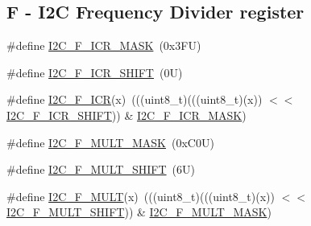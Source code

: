 \subsection*{F -\/ I2C Frequency Divider register}
\begin{DoxyCompactItemize}
\item 
\#define \mbox{\hyperlink{group___i2_c___register___masks_gaeb777a93b5695409902fb2f2b77eb760}{I2\+C\+\_\+\+F\+\_\+\+I\+C\+R\+\_\+\+M\+A\+SK}}~(0x3\+F\+U)
\item 
\#define \mbox{\hyperlink{group___i2_c___register___masks_ga8e2daf0de75e77e33467f6b132be0c30}{I2\+C\+\_\+\+F\+\_\+\+I\+C\+R\+\_\+\+S\+H\+I\+FT}}~(0\+U)
\item 
\#define \mbox{\hyperlink{group___i2_c___register___masks_ga18089fd1cbe1936b133d50d580d39e6d}{I2\+C\+\_\+\+F\+\_\+\+I\+CR}}(x)~(((uint8\+\_\+t)(((uint8\+\_\+t)(x)) $<$$<$ \mbox{\hyperlink{group___i2_c___register___masks_ga8e2daf0de75e77e33467f6b132be0c30}{I2\+C\+\_\+\+F\+\_\+\+I\+C\+R\+\_\+\+S\+H\+I\+FT}})) \& \mbox{\hyperlink{group___i2_c___register___masks_gaeb777a93b5695409902fb2f2b77eb760}{I2\+C\+\_\+\+F\+\_\+\+I\+C\+R\+\_\+\+M\+A\+SK}})
\item 
\#define \mbox{\hyperlink{group___i2_c___register___masks_ga9e077caa9ac07c03f5e34e431d0806fa}{I2\+C\+\_\+\+F\+\_\+\+M\+U\+L\+T\+\_\+\+M\+A\+SK}}~(0x\+C0\+U)
\item 
\#define \mbox{\hyperlink{group___i2_c___register___masks_ga3a338cb3af4c140fde82427d091d5b4a}{I2\+C\+\_\+\+F\+\_\+\+M\+U\+L\+T\+\_\+\+S\+H\+I\+FT}}~(6\+U)
\item 
\#define \mbox{\hyperlink{group___i2_c___register___masks_ga8f7d596736ebbdc72c823abdc045adfd}{I2\+C\+\_\+\+F\+\_\+\+M\+U\+LT}}(x)~(((uint8\+\_\+t)(((uint8\+\_\+t)(x)) $<$$<$ \mbox{\hyperlink{group___i2_c___register___masks_ga3a338cb3af4c140fde82427d091d5b4a}{I2\+C\+\_\+\+F\+\_\+\+M\+U\+L\+T\+\_\+\+S\+H\+I\+FT}})) \& \mbox{\hyperlink{group___i2_c___register___masks_ga9e077caa9ac07c03f5e34e431d0806fa}{I2\+C\+\_\+\+F\+\_\+\+M\+U\+L\+T\+\_\+\+M\+A\+SK}})
\end{DoxyCompactItemize}
